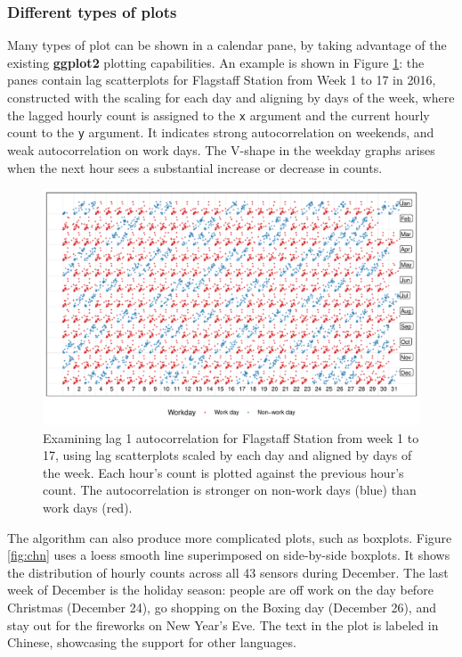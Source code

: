 \documentclass[12pt]{article}
\begin{document}
\hypertarget{different-types-of-plots}{%
\subsubsection{Different types of plots}\label{different-types-of-plots}}

Many types of plot can be shown in a calendar pane, by taking advantage of the existing \textbf{ggplot2} plotting capabilities. An example is shown in Figure \ref{fig:scatterplot}: the panes contain lag scatterplots for Flagstaff Station from Week 1 to 17 in 2016, constructed with the scaling for each day and aligning by days of the week, where the lagged hourly count is assigned to the \texttt{x} argument and the current hourly count to the \texttt{y} argument. It indicates strong autocorrelation on weekends, and weak autocorrelation on work days. The V-shape in the weekday graphs arises when the next hour sees a substantial increase or decrease in counts.

\begin{figure}

{\centering \includegraphics[width=0.7\linewidth]{figure/scatterplot-1} 

}

\caption{Examining lag 1 autocorrelation for Flagstaff Station from week 1 to 17, using lag scatterplots scaled by each day and aligned by days of the week. Each hour's count is plotted against the previous hour's count. The autocorrelation is stronger on non-work days (blue) than work days (red).}\label{fig:scatterplot}
\end{figure}



The algorithm can also produce more complicated plots, such as boxplots. Figure \ref{fig:chn} uses a loess smooth line \citep{cleveland1979loess} superimposed on side-by-side boxplots. It shows the distribution of hourly counts across all 43 sensors during December. The last week of December is the holiday season: people are off work on the day before Christmas (December 24), go shopping on the Boxing day (December 26), and stay out for the fireworks on New Year's Eve. The text in the plot is labeled in Chinese, showcasing the support for other languages.
\end{document}
